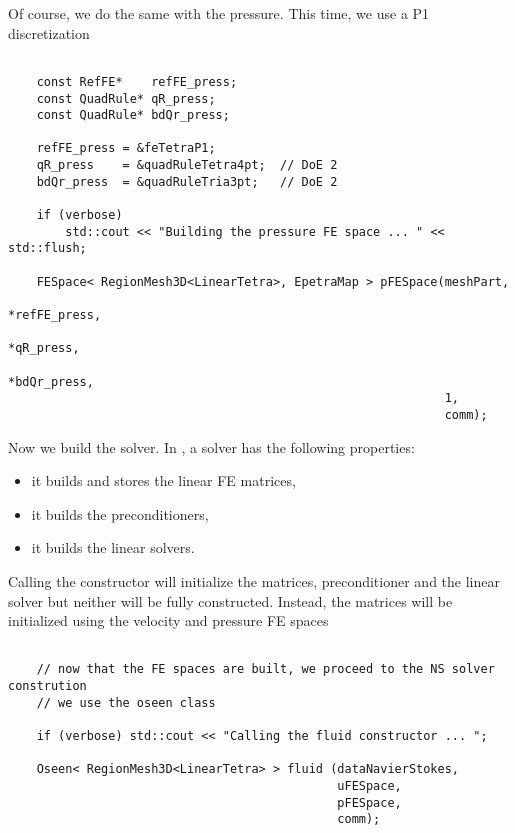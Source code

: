 Of course, we do the same with the pressure. This time, we use a P1 discretization

\begin{verbatim}

    const RefFE*    refFE_press;
    const QuadRule* qR_press;
    const QuadRule* bdQr_press;

    refFE_press = &feTetraP1;
    qR_press    = &quadRuleTetra4pt;  // DoE 2
    bdQr_press  = &quadRuleTria3pt;   // DoE 2

    if (verbose)
        std::cout << "Building the pressure FE space ... " << std::flush;

    FESpace< RegionMesh3D<LinearTetra>, EpetraMap > pFESpace(meshPart,
                                                             *refFE_press,
                                                             *qR_press,
                                                             *bdQr_press,
                                                             1,
                                                             comm);

\end{verbatim}

Now we build the solver. In \lifev,
a solver has the following properties:
\begin{itemize}
\item it builds and stores the linear FE matrices,
\item it builds the preconditioners,
\item it builds the linear solvers.
\end{itemize}

Calling the constructor will initialize the matrices, preconditioner and the linear solver
but neither will be fully constructed. Instead, the matrices will be initialized using the
velocity and pressure FE spaces

\begin{verbatim}

    // now that the FE spaces are built, we proceed to the NS solver constrution
    // we use the oseen class

    if (verbose) std::cout << "Calling the fluid constructor ... ";

    Oseen< RegionMesh3D<LinearTetra> > fluid (dataNavierStokes,
                                              uFESpace,
                                              pFESpace,
                                              comm);


\end{verbatim}

